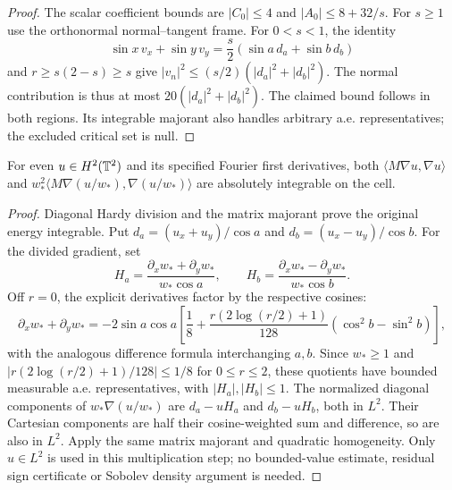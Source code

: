 \begin{proof}
\leanok
The scalar coefficient bounds are $|C_0|\le4$ and $|A_0|\le8+32/s$.
For $s\ge1$ use the orthonormal normal--tangent frame.
For $0<s<1$, the identity
\[
 \sin x\,v_x+\sin y\,v_y
 =\frac s2(\sin a\,d_a+\sin b\,d_b)
\]
and $r\ge s(2-s)\ge s$ give
$|v_n|^2\le(s/2)(|d_a|^2+|d_b|^2)$.
The normal contribution is thus at most $20(|d_a|^2+|d_b|^2)$.
The claimed bound follows in both regions. Its integrable majorant also
handles arbitrary a.e. representatives; the excluded critical set is null.
\end{proof}

\begin{lemma}
\label{lem:dd-gradient-energies-integrable}
\leanok
For even $u\in H^2(\mathbb{T}^2)$ and its specified Fourier first derivatives,
both $\langle M\nabla u,\nabla u\rangle$ and
$w_*^2\langle M\nabla(u/w_*),\nabla(u/w_*)\rangle$ are absolutely
integrable on the cell.
\end{lemma}

\begin{proof}
\leanok
Diagonal Hardy division and the matrix majorant prove the original energy
integrable. Put $d_a=(u_x+u_y)/\cos a$ and $d_b=(u_x-u_y)/\cos b$.
For the divided gradient, set
\[
 H_a=\frac{\partial_xw_*+\partial_yw_*}{w_*\cos a},\qquad
 H_b=\frac{\partial_xw_*-\partial_yw_*}{w_*\cos b}.
\]
Off $r=0$, the explicit derivatives factor by the respective cosines:
\[
 \partial_xw_*+\partial_yw_*=
 -2\sin a\cos a\left[\frac18+
 \frac{r(2\log(r/2)+1)}{128}(\cos^2b-\sin^2b)\right],
\]
with the analogous difference formula interchanging $a,b$.
Since $w_*\ge1$ and $|r(2\log(r/2)+1)/128|\le1/8$ for $0\le r\le2$,
these quotients have bounded measurable a.e. representatives, with $|H_a|,|H_b|\le1$.
The normalized diagonal components of $w_*\nabla(u/w_*)$ are
$d_a-uH_a$ and $d_b-uH_b$, both in $L^2$.
Their Cartesian components are half their cosine-weighted sum and difference,
so are also in $L^2$. Apply the same matrix majorant and quadratic homogeneity.
Only $u\in L^2$ is used in this multiplication step; no bounded-value estimate,
residual sign certificate or Sobolev density argument is needed.
\end{proof}

